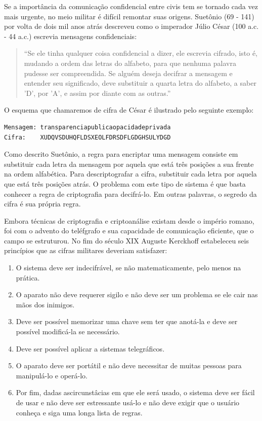 Se a importância da comunicação confidencial entre civis tem se tornado cada vez mais urgente, no meio militar é difícil remontar suas origens. 
Suetônio (69 - 141) por volta de dois mil anos atrás descreveu como o imperador Júlio César (100 a.c. - 44 a.c.) escrevia mensagens confidenciais:


\begin{quote}
  ``Se ele tinha qualquer coisa confidencial a dizer, ele escrevia cifrado, isto é, mudando a ordem das letras do alfabeto, para que nenhuma palavra pudesse ser compreendida. 
  Se alguém deseja decifrar a mensagem e entender seu significado, deve substituir a quarta letra do alfabeto, a saber 'D', por 'A', e assim por diante com as outras.''
\end{quote}

O esquema que chamaremos de cifra de César é ilustrado pelo seguinte exemplo:

\begin{verbatim}
Mensagem: transparenciapublicaopacidadeprivada
Cifra:    XUDQVSDUHQFLDSXEOLFDRSDFLGDGHSULYDGD
\end{verbatim}

Como descrito Suetônio, a regra para encriptar uma mensagem consiste em substituir cada letra da mensagem por aquela que está três posições a sua frente na ordem alfabética.
Para descriptografar a cifra, substituir cada letra por aquela que está três posições atrás.
O problema com este tipo de sistema é que basta conhecer a regra de criptografia para decifrá-lo.
Em outras palavras, o segredo da cifra é sua própria regra.
 
Embora técnicas de criptografia e criptoanálise existam desde o império romano, foi com o advento do teléfgrafo e sua capacidade de comunicação eficiente, que o campo se estruturou.
No fim do século XIX Auguste Kerckhoff estabeleceu seis princípios que as cifras militares deveriam satisfazer:
\begin{enumerate}
\item O sistema deve ser indecifrável, se não matematicamente, pelo menos na prática.
\item O aparato não deve requerer sigilo e não deve ser um problema se ele cair nas mãos dos inimigos.
\item Deve ser possível memorizar uma chave sem ter que anotá-la e deve ser possível modificá-la se necessário.
\item Deve ser possível aplicar a sistemas telegráficos.
\item O aparato deve ser portátil e não deve necessitar de muitas pessoas para manipulá-lo e operá-lo.
\item Por fim, dadas ascircunstâcias em que ele será usado, o sistema deve ser fácil de usar e não deve ser estressante usá-lo e não deve exigir que o usuário conheça e siga uma longa lista de regras.
\end{enumerate}

